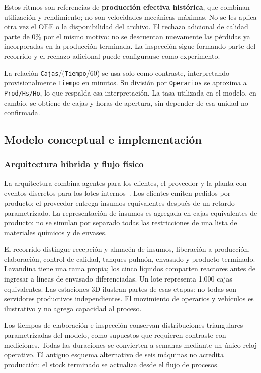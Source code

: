 \documentclass[11pt, a4paper]{article}
\begin{document}
Estos ritmos son referencias de \textbf{producción efectiva histórica}, que combinan utilización y rendimiento; no son velocidades mecánicas máximas. No se les aplica otra vez el OEE o la disponibilidad del archivo. El rechazo adicional de calidad parte de 0\% por el mismo motivo: no se descuentan nuevamente las pérdidas ya incorporadas en la producción terminada. La inspección sigue formando parte del recorrido y el rechazo adicional puede configurarse como experimento.

La relación \texttt{Cajas}/(\texttt{Tiempo}/60) se usa solo como contraste, interpretando provisionalmente \texttt{Tiempo} en minutos. Su división por \texttt{Operarios} se aproxima a \texttt{Prod/Hs/Ho}, lo que respalda esa interpretación. La tasa utilizada en el modelo, en cambio, se obtiene de cajas y horas de apertura, sin depender de esa unidad no confirmada.

\subsection{Modelo conceptual e implementación}
\subsubsection{Arquitectura híbrida y flujo físico}
La arquitectura combina agentes para los clientes, el proveedor y la planta con eventos discretos para los lotes internos~\cite{lawkelton,banks,wu2011}. Los clientes emiten pedidos por producto; el proveedor entrega insumos equivalentes después de un retardo parametrizado. La representación de insumos es agregada en cajas equivalentes de producto: no se simulan por separado todas las restricciones de una lista de materiales químicos y de envases.

El recorrido distingue recepción y almacén de insumos, liberación a producción, elaboración, control de calidad, tanques pulmón, envasado y producto terminado. Lavandina tiene una rama propia; los cinco líquidos comparten reactores antes de ingresar a líneas de envasado diferenciadas. Un lote representa 1.000 cajas equivalentes. Las estaciones 3D ilustran partes de esas etapas: no todas son servidores productivos independientes. El movimiento de operarios y vehículos es ilustrativo y no agrega capacidad al proceso.

Los tiempos de elaboración e inspección conservan distribuciones triangulares parametrizadas del modelo, como supuestos que requieren contraste con mediciones. Todas las duraciones se convierten a semanas mediante un único reloj operativo. El antiguo esquema alternativo de seis máquinas no acredita producción: el stock terminado se actualiza desde el flujo de procesos.
\end{document}
